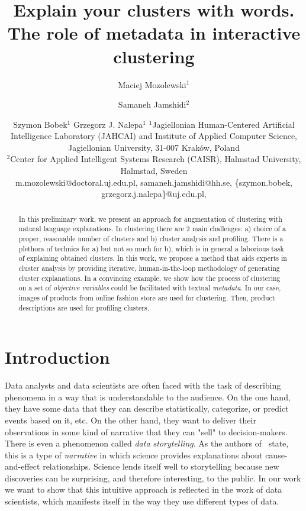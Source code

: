 \documentclass{article}
\title{Explain your clusters with words. The role of metadata in interactive clustering}
\author{
Maciej Mozolewski$^1$
\and
Samaneh Jamshidi$^2$\and
Szymon Bobek$^1$\And
Grzegorz J. Nalepa$^1$
\affiliations
$^1$Jagiellonian Human-Centered Artificial Intelligence Laboratory (JAHCAI) and Institute of Applied Computer Science, Jagiellonian University, 31-007 Kraków, Poland\\
$^2$Center for Applied Intelligent Systems Research (CAISR), Halmstad University, Halmstad, Sweden\\
\emails
m.mozolewski@doctoral.uj.edu.pl,
samaneh.jamshidi@hh.se,
\{szymon.bobek, grzegorz.j.nalepa\}@uj.edu.pl,
}
\begin{document}
\maketitle

\begin{abstract}
    In this preliminary work, we present an approach for augmentation of clustering with natural language explanations.
    In clustering there are 2 main challenges: a) choice of a proper, reasonable number of clusters and b) cluster analysis and profiling.
    There is a plethora of technics for a) but not so much for b), which is in general a laborious task of explaining obtained clusters.
    In this work, we propose a method that aids experts in cluster analysis by providing iterative, human-in-the-loop methodology of generating cluster explanations.
    In a convincing example, we show how the process of clustering on a set of \textit{objective variables} could be facilitated with textual \textit{metadata}.
    In our case, images of products from online fashion store are used for clustering.
    Then, product descriptions are used for profiling clusters.
\end{abstract}

\section{Introduction}\label{sec:introduction}
Data analysts and data scientists are often faced with the task of describing phenomena in a way that is understandable to the audience.
On the one hand, they have some data that they can describe statistically, categorize, or predict events based on it, etc.
On the other hand, they want to deliver their observations in some kind of narrative that they can "sell" to decision-makers.
There is even a phenomenon called \textit{data storytelling}.
As the authors of~\cite{doi:10.1080/01972243.2021.1951415} state, this is a type of \textit{narrative} in which science provides explanations about cause-and-effect relationships.
Science lends itself well to storytelling because new discoveries can be surprising, and therefore interesting, to the public.
In our work we want to show that this intuitive approach is reflected in the work of data scientists, which manifests itself in the way they use different types of data.
\end{document}
